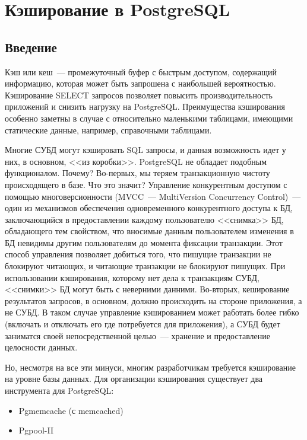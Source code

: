 \chapter{Кэширование в PostgreSQL}
\begin{epigraphs}
\end{epigraphs}
\section{Введение}
Кэш или кеш~--- промежуточный буфер с быстрым доступом, содержащий информацию, которая может быть запрошена с наибольшей вероятностью.
Кэширование SELECT запросов позволяет повысить производительность приложений и снизить нагрузку на PostgreSQL. 
Преимущества кэширования особенно заметны в случае с относительно маленькими таблицами, имеющими статические данные, 
например, справочными таблицами. 

Многие СУБД могут кэшировать SQL запросы, и данная возможность идет у них, в основном, <<из коробки>>. 
PostgreSQL не обладает подобным функционалом. Почему? 
Во-первых, мы теряем транзакционную чистоту происходящего в базе. Что это значит?
Управление конкурентным доступом с помощью многоверсионности (MVCC~--- MultiVersion Concurrency Control)~--- 
один из механизмов обеспечения одновременного конкурентного доступа к БД, заключающийся в предоставлении каждому 
пользователю <<снимка>> БД, обладающего тем свойством, что вносимые данным пользователем изменения в БД невидимы 
другим пользователям до момента фиксации транзакции. Этот способ управления позволяет добиться того, что пишущие 
транзакции не блокируют читающих, и читающие транзакции не блокируют пишущих. 
При использовании кэширования, которому нет дела к транзакциям СУБД, <<снимки>> БД могут быть с неверними данними.
Во-вторых, кеширование результатов запросов, в основном, должно происходить на стороне приложения, а не СУБД. 
В таком случае управление кэшированием может работать более гибко (включать и отключать его где потребуется для приложения), а 
СУБД будет заниматся своей непосредственной целью~--- хранение и предоставление целосности данных.

Но, несмотря на все эти минуси, многим разработчикам требуется кэширование на уровне базы данных. 
Для организации кэширования существует два инструмента для PostgreSQL:
\begin{itemize}
\item Pgmemcache (с memcached)
\item Pgpool-II
\end{itemize}


